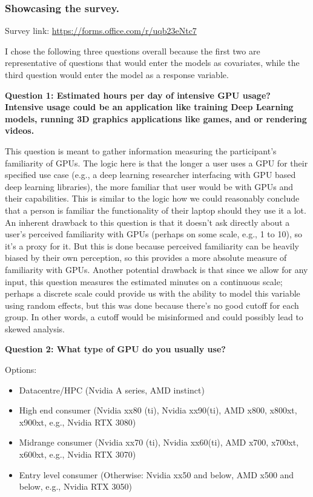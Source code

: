 \documentclass[
]{article}
\begin{document}
\hypertarget{showcasing-the-survey.}{%
\subsubsection{Showcasing the survey.}\label{showcasing-the-survey.}}

Survey link: \url{https://forms.office.com/r/uqb23eNtc7}

I chose the following three questions overall because the first two are
representative of questions that would enter the models as covariates,
while the third question would enter the model as a response variable.

\textbf{Question 1: Estimated hours per day of intensive GPU usage?
Intensive usage could be an application like training Deep Learning
models, running 3D graphics applications like games, and or rendering
videos.}

This question is meant to gather information measuring the participant's
familiarity of GPUs. The logic here is that the longer a user uses a GPU
for their specified use case (e.g., a deep learning researcher
interfacing with GPU based deep learning libraries), the more familiar
that user would be with GPUs and their capabilities. This is similar to
the logic how we could reasonably conclude that a person is familiar the
functionality of their laptop should they use it a lot. An inherent
drawback to this question is that it doesn't ask directly about a user's
perceived familiarity with GPUs (perhaps on some scale, e.g., 1 to 10),
so it's a proxy for it. But this is done because perceived familiarity
can be heavily biased by their own perception, so this provides a more
absolute measure of familiarity with GPUs. Another potential drawback is
that since we allow for any input, this question measures the estimated
minutes on a continuous scale; perhaps a discrete scale could provide us
with the ability to model this variable using random effects, but this
was done because there's no good cutoff for each group. In other words,
a cutoff would be misinformed and could possibly lead to skewed
analysis.

\textbf{Question 2: What type of GPU do you usually use?}

Options:

\begin{itemize}
\item
  Datacentre/HPC (Nvidia A series, AMD instinct)
\item
  High end consumer (Nvidia xx80 (ti), Nvidia xx90(ti), AMD x800,
  x800xt, x900xt, e.g., Nvidia RTX 3080)
\item
  Midrange consumer (Nvidia xx70 (ti), Nvidia xx60(ti), AMD x700,
  x700xt, x600xt, e.g., Nvidia RTX 3070)
\item
  Entry level consumer (Otherwise: Nvidia xx50 and below, AMD x500 and
  below, e.g., Nvidia RTX 3050)
\end{itemize}
\end{document}
